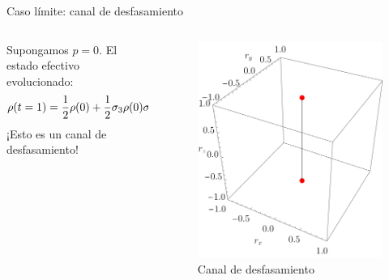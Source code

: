 \begin{frame}{Caso límite: canal de desfasamiento}
    \begin{columns}
        \begin{column}{0.5\textwidth}
            Supongamos $p=0$. El estado efectivo evolucionado:
            \begin{equation*}
              \rho(t=1)=\frac{1}{2}\rho(0)+\frac{1}{2}\sigma_{3}\rho(0)\sigma_{3}.
            \end{equation*}\pause
            ¡Esto es un canal de desfasamiento!\pause
        \end{column}
        \begin{column}{0.5\textwidth}
            \begin{figure}[h!]
                \centering
                \includegraphics[width=0.7\linewidth]{figures/maxent_results/CNOT_p=1._t=1_r=0.9.png}
                \caption{Canal de desfasamiento}
              \end{figure}
        \end{column}
    \end{columns}
\end{frame}
